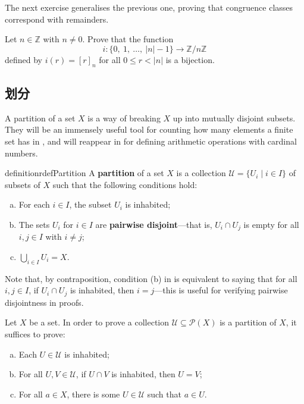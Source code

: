 The next exercise generalises the previous one, proving that congruence classes correspond with remainders.

\begin{exercise}
\label{exCongruenceClassesCorrespondWithRemainders}
Let $n \in \mathbb{Z}$ with $n \ne 0$. Prove that the function
\[ i : \{ 0,~ 1,~ \dots,~ |n|-1 \} \to \mathbb{Z}/n\mathbb{Z} \]
defined by $i(r) = [r]_n$ for all $0 \le r < |n|$ is a bijection.
\end{exercise}

\subsection*{划分}

A partition of a set $X$ is a way of breaking $X$ up into mutually disjoint subsets. They will be an immensely useful tool for counting how many elements a finite set has in , and will reappear in  for defining arithmetic operations with cardinal numbers.

\begin{restatable}{definition}{rdefPartition}
\label{defPartition}
A \textbf{partition} of a set $X$ is a collection $\mathcal{U} = \{ U_i \mid i \in I \}$ of subsets of $X$ such that the following conditions hold:
\begin{enumerate}[(a)]
\item For each $i \in I$, the subset $U_i$ is inhabited;
\item The sets $U_i$ for $i \in I$ are \textbf{pairwise disjoint}---that is, $U_i \cap U_j$ is empty for all $i,j \in I$ with $i \ne j$;
\item $\bigcup_{i \in I} U_i = X$.
\end{enumerate}
\end{restatable}

Note that, by contraposition, condition (b) in  is equivalent to saying that for all $i,j \in I$, if $U_i \cap U_j$ is inhabited, then $i=j$---this is useful for verifying pairwise disjointness in proofs.

\begin{strategy}
\label{strProvingSubsetsFormPartition}
Let $X$ be a set. In order to prove a collection $\mathcal{U} \subseteq \mathcal{P}(X)$ is a partition of $X$, it suffices to prove:
\begin{enumerate}[(a)]
\item Each $U \in \mathcal{U}$ is inhabited;
\item For all $U, V \in \mathcal{U}$, if $U \cap V$ is inhabited, then $U=V$;
\item For all $a \in X$, there is some $U \in \mathcal{U}$ such that $a \in U$.
\end{enumerate}
\end{strategy}


